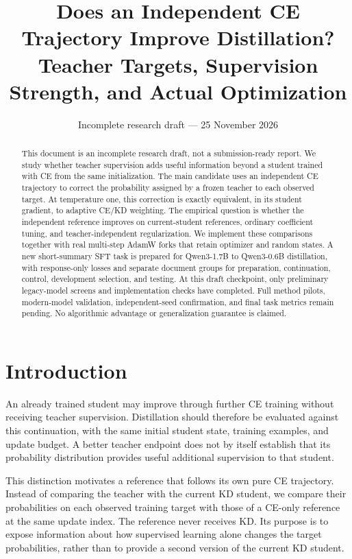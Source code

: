\documentclass[11pt]{article}
\title{Does an Independent CE Trajectory Improve Distillation?\\
Teacher Targets, Supervision Strength, and Actual Optimization}
\author{Incomplete research draft --- 25 November 2026}
\begin{document}
\maketitle
\begin{abstract}
This document is an incomplete research draft, not a submission-ready report.
We study whether teacher supervision adds useful information beyond a student
trained with CE from the same initialization. The main candidate uses an
independent CE trajectory to correct the probability assigned by a frozen
teacher to each observed target. At temperature one, this correction is
exactly equivalent, in its student gradient, to adaptive CE/KD weighting.
The empirical question is whether the independent reference improves on
current-student references, ordinary coefficient tuning, and teacher-independent
regularization. We implement these comparisons together with real multi-step
AdamW forks that retain optimizer and random states. A new short-summary SFT
task is prepared for Qwen3-1.7B to Qwen3-0.6B distillation, with response-only
losses and separate document groups for preparation, continuation, control,
development selection, and testing. At this draft checkpoint, only preliminary
legacy-model screens and implementation checks have completed. Full method
pilots, modern-model validation, independent-seed confirmation, and final task
metrics remain pending. No algorithmic advantage or generalization guarantee
is claimed.
\end{abstract}

\section{Introduction}
An already trained student may improve through further CE training without
receiving teacher supervision. Distillation should therefore be evaluated
against this continuation, with the same initial student state, training
examples, and update budget. A better teacher endpoint does not by itself
establish that its probability distribution provides useful additional
supervision to that student.

This distinction motivates a reference that follows its own pure CE
trajectory. Instead of comparing the teacher with the current KD student,
we compare their probabilities on each observed training target with those
of a CE-only reference at the same update index. The reference never receives
KD. Its purpose is to expose information about how supervised learning alone
changes the target probabilities, rather than to provide a second version
of the current KD student.
\end{document}
